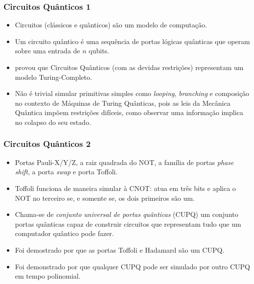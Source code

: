 \documentclass{beamer}
\begin{document}
\begin{frame}
\frametitle{Circuitos Quânticos 1}
\begin{itemize}
  \item Circuitos (clássicos e quânticos) são um modelo de computação.
  \item Um circuito quântico é uma sequência de portas lógicas quânticas que
    operam sobre uma entrada de $n$ qubits.
  \item  \cite{be:97} provou que Circuitos Quânticos (com as devidas restrições)
    representam um modelo Turing-Completo.
  \item Não é trivial simular primitivas simples como
    \textit{looping}, \textit{branching} e composição no contexto de
    Máquinas de Turing Quânticas, pois as leis da Mecânica Quântica
    impõem restrições difíceis, como observar uma informação implica
    no colapso do seu estado.
\end{itemize}
\end{frame}

\begin{frame}
\frametitle{Circuitos Quânticos 2}
\begin{itemize}
  \item Portas Pauli-X/Y/Z, a raiz quadrada do NOT, a família de portas
    \textit{phase shift}, a porta \textit{swap} e porta Toffoli.
  \item Toffoli funciona de maneira simular à CNOT: atua em três bits
    e aplica o NOT no terceiro se, e somente se, os dois primeiros são
    um.
  \item Chama-se de \textit{conjunto universal de portas quânticas}
    (CUPQ) um conjunto portas quânticas capaz de construir circuitos
    que representam tudo que um computador quântico pode fazer.
  \item Foi demostrado por \cite{shi:03} que as portas Toffoli e
    Hadamard são um CUPQ.
  \item Foi demonstrado por \cite{da:06} que qualquer CUPQ pode
    ser simulado por outro CUPQ em tempo polinomial.
\end{itemize}
\end{frame}
\end{document}
